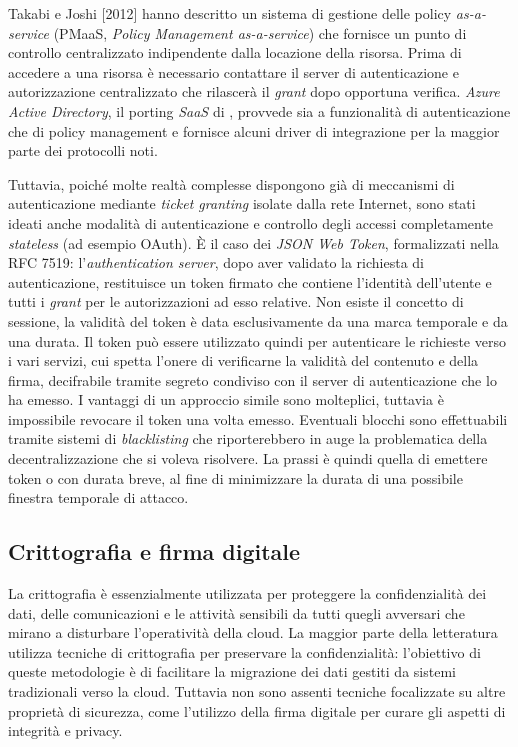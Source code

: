 \documentclass[../main.tex]{subfiles}
\begin{document}
Takabi e Joshi [2012] hanno descritto un sistema di gestione delle policy \textit{as-a-service} (PMaaS, \textit{Policy Management as-a-service}) che fornisce un punto di controllo centralizzato indipendente dalla locazione della risorsa. 
Prima di accedere a una risorsa è necessario contattare il server di autenticazione e autorizzazione centralizzato che rilascerà il \textit{grant} dopo opportuna verifica.
\textit{Azure Active Directory}, il porting \textit{SaaS} di , provvede sia a funzionalità di autenticazione che di policy management e fornisce alcuni driver di integrazione per la maggior parte dei protocolli noti.


Tuttavia, poiché molte realtà complesse dispongono già di meccanismi di autenticazione mediante \textit{ticket granting} isolate dalla rete Internet, sono stati ideati anche modalità di autenticazione e controllo degli accessi completamente \textit{stateless} (ad esempio OAuth).
È il caso dei \textit{JSON Web Token}, formalizzati nella RFC 7519: l'\textit{authentication server}, dopo aver validato la richiesta di autenticazione, restituisce un token  firmato che contiene l'identità dell'utente e tutti i \textit{grant} per le autorizzazioni ad esso relative.
Non esiste il concetto di sessione, la validità del token è data esclusivamente da una marca temporale e da una durata. Il token può essere utilizzato quindi per autenticare le richieste verso i vari servizi, cui spetta l'onere di verificarne la validità del contenuto e della firma, decifrabile tramite segreto condiviso con il server di autenticazione che lo ha emesso.
I vantaggi di un approccio simile sono molteplici, tuttavia è impossibile revocare il token una volta emesso. Eventuali blocchi sono effettuabili tramite sistemi di \textit{blacklisting} che riporterebbero in auge la problematica della decentralizzazione che si voleva risolvere. La prassi è quindi quella di emettere token  o con durata breve, al fine di minimizzare la durata di una possibile finestra temporale di attacco.

\subsection{Crittografia e firma digitale}
La crittografia è essenzialmente utilizzata per proteggere la confidenzialità dei dati, delle comunicazioni e le attività sensibili da tutti quegli avversari che mirano a disturbare l'operatività della cloud.
La maggior parte della letteratura utilizza tecniche di crittografia per preservare la confidenzialità: l'obiettivo di queste metodologie è di facilitare la migrazione dei dati gestiti da sistemi tradizionali verso la cloud.
Tuttavia non sono assenti tecniche focalizzate su altre proprietà di sicurezza, come l'utilizzo della firma digitale per curare gli aspetti di integrità e privacy.
\end{document}
